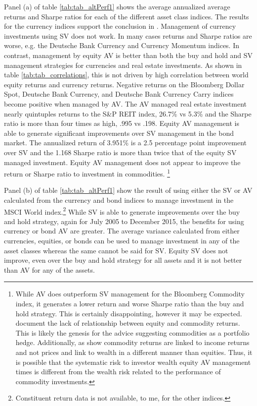 Panel (a) of table \ref{tab:tab_altPerf1} shows the average annualized average returns and Sharpe ratios for each of the different asset class indices. The results for the currency indices support the conclusion in \citet{moreira_volatility-managed_2017}. Management of currency investments using SV does not work. In many cases returns and Sharpe ratios are worse, e.g. the Deutsche Bank Currency and Currency Momentum indices. In contrast, management by equity AV is better than both the buy and hold and SV management strategies for currencies and real estate investments. As shown in table \ref{tab:tab_correlations}, this is not driven by high correlation between world equity returns and currency returns. Negative returns on the Bloomberg Dollar Spot, Deutsche Bank Currency, and Deutsche Bank Currency Carry indices become positive when managed by AV. The AV managed real estate investment nearly quintuples returns to the S\&P REIT index, 26.7\% vs 5.3\% and the Sharpe ratio is more than four times as high, .995 vs .198. Equity AV management is able to generate significant improvements over SV management in the bond market. The annualized return of 3.951\% is a 2.5 percentage point improvement over SV and the 1.168 Sharpe ratio is more than twice that of the equity SV managed investment. Equity AV management does not appear to improve the return or Sharpe ratio to investment in commodities. \footnote{While AV does outperform SV management for the Bloomberg Commodity index, it generates a lower return and worse Sharpe ratio than the buy and hold strategy. This is certainly disappointing, however it may be expected. \citet{gorton_facts_2006,buyuksahin_commodities_2008,NBERw21243} document the lack of relationship between equity and commodity returns. This is likely the genesis for the advice suggesting commodities as a portfolio hedge. Additionally, as \citet{erb_conquering_nodate} show commodity returns are linked to income returns and not prices and link to wealth in a different manner than equities. Thus, it is possible that the systematic risk to investor wealth equity AV management times is different from the wealth risk related to the performance of commodity investments.}

Panel (b) of table \ref{tab:tab_altPerf1} show the result of using either the SV or AV calculated from the currency and bond indices to manage investment in the MSCI World index.\footnote{Constituent return data is not available, to me, for the other indices.} While SV is able to generate improvements over the buy and hold strategy, again for July 2005 to December 2015, the benefits for using currency or bond AV are greater. The average variance calculated from either currencies, equities, or bonds can be used to manage investment in any of the asset classes whereas the same cannot be said for SV. Equity SV does not improve, even over the buy and hold strategy for all assets and it is not better than AV for any of the assets.

